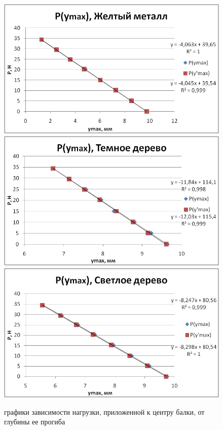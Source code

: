 \documentclass[a4paper,14pt]{extarticle}
\begin{document}
\begin{enumerate}
\begin{figure}[H]
		\includegraphics[scale = 0.65]{"1.3.2_2.jpg"}		
		\includegraphics[scale = 0.65]{"1.3.2_3.jpg"}
		\includegraphics[scale = 0.65]{"1.3.2_4.jpg"}
	\caption{графики зависимости нагрузки, приложенной к центру балки, от глубины ее прогиба}
\end{figure}
	\begin{table}[H]

\end{table}
\end{enumerate}
\end{document}

